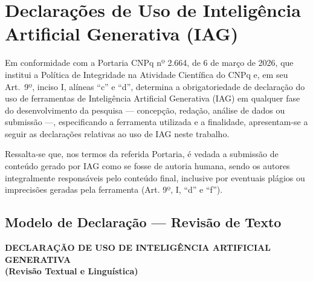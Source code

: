 
%

\chapter{Declarações de Uso de Inteligência Artificial Generativa (IAG)}
\label{apendice_declaracao_iag}

\noindent
Em conformidade com a Portaria CNPq nº 2.664, de 6 de março de 2026, que institui a
Política de Integridade na Atividade Científica do CNPq e, em seu Art.~9º, inciso I,
alíneas ``c'' e ``d'', determina a obrigatoriedade de declaração do uso de ferramentas
de Inteligência Artificial Generativa (IAG) em qualquer fase do desenvolvimento da
pesquisa --- concepção, redação, análise de dados ou submissão ---, especificando a
ferramenta utilizada e a finalidade, apresentam-se a seguir as declarações relativas
ao uso de IAG neste trabalho.

\bigskip
\noindent
Ressalta-se que, nos termos da referida Portaria, é vedada a submissão de conteúdo
gerado por IAG como se fosse de autoria humana, sendo os autores integralmente
responsáveis pelo conteúdo final, inclusive por eventuais plágios ou imprecisões
geradas pela ferramenta (Art. 9º, I, ``d'' e ``f'').


\section{Modelo de Declaração --- Revisão de Texto}
\label{ap:declaracao_revisao_texto}

\begin{center}
\textbf{\large DECLARAÇÃO DE USO DE INTELIGÊNCIA ARTIFICIAL GENERATIVA}\\
\textbf{(Revisão Textual e Linguística)}
\end{center}

